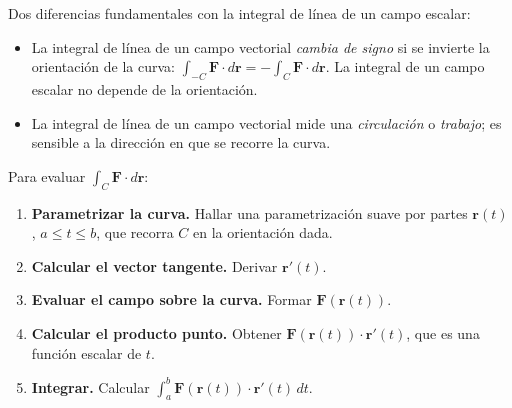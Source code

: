 \begin{rem}
Dos diferencias fundamentales con la integral de línea de un campo
escalar:
\begin{itemize}
    \item La integral de línea de un campo vectorial \emph{cambia de
    signo} si se invierte la orientación de la curva: $\int_{-C}
    \mathbf{F}\cdot d\mathbf{r} = -\int_C \mathbf{F}\cdot d\mathbf{r}$.
    La integral de un campo escalar no depende de la orientación.
    \item La integral de línea de un campo vectorial mide una
    \emph{circulación} o \emph{trabajo}; es sensible a la dirección en
    que se recorre la curva.
\end{itemize}
\end{rem}

\begin{pasos}
Para evaluar $\displaystyle \int_C \mathbf{F} \cdot d\mathbf{r}$:
\begin{enumerate}
    \item \textbf{Parametrizar la curva.} Hallar una parametrización
    suave por partes $\mathbf{r}(t)$, $a \le t \le b$, que recorra $C$
    en la orientación dada.
    \item \textbf{Calcular el vector tangente.} Derivar $\mathbf{r}' (t)$.
    \item \textbf{Evaluar el campo sobre la curva.} Formar
    $\mathbf{F}(\mathbf{r}(t))$.
    \item \textbf{Calcular el producto punto.} Obtener
    $\mathbf{F}(\mathbf{r}(t)) \cdot \mathbf{r}'(t)$, que es una
    función escalar de $t$.
    \item \textbf{Integrar.} Calcular $\displaystyle \int_a^b
    \mathbf{F}(\mathbf{r}(t)) \cdot \mathbf{r}'(t) \, dt$.
\end{enumerate}
\end{pasos}

